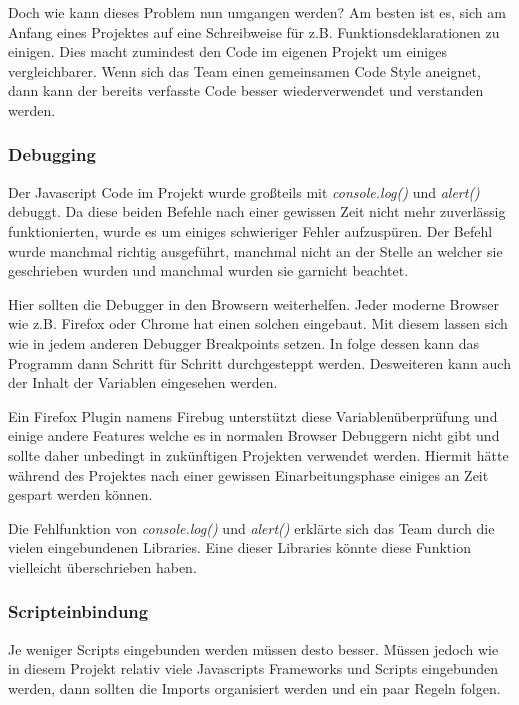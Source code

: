 Doch wie kann dieses Problem nun umgangen werden? Am besten ist es, sich am Anfang eines Projektes auf eine Schreibweise für z.B. Funktionsdeklarationen zu einigen. Dies macht zumindest den Code im eigenen Projekt um einiges vergleichbarer. Wenn sich das Team einen gemeinsamen Code Style aneignet, dann kann der bereits verfasste Code besser wiederverwendet und verstanden werden.

\newpage

\subsubsection{Debugging}
Der Javascript Code im Projekt wurde großteils mit \textit{console.log()} und \textit{alert()} debuggt. Da diese beiden Befehle nach einer gewissen Zeit nicht mehr zuverlässig funktionierten, wurde es um einiges schwieriger Fehler aufzuspüren. Der Befehl wurde manchmal richtig ausgeführt, manchmal nicht an der Stelle an welcher sie geschrieben wurden und manchmal wurden sie garnicht beachtet. 

Hier sollten die Debugger in den Browsern weiterhelfen. Jeder moderne Browser wie z.B. Firefox oder Chrome hat einen solchen eingebaut. Mit diesem lassen sich wie in jedem anderen Debugger Breakpoints setzen. In folge dessen kann das Programm dann Schritt für Schritt durchgesteppt werden. Desweiteren kann auch der Inhalt der Variablen eingesehen werden. 

Ein Firefox Plugin namens Firebug unterstützt diese Variablenüberprüfung und einige andere Features welche es in normalen Browser Debuggern nicht gibt und sollte daher unbedingt in zukünftigen Projekten verwendet werden. Hiermit hätte während des Projektes nach einer gewissen Einarbeitungsphase einiges an Zeit gespart werden können. 


Die Fehlfunktion von \textit{console.log()} und \textit{alert()} erklärte sich das Team durch die vielen eingebundenen Libraries. Eine dieser Libraries könnte diese Funktion vielleicht überschrieben haben.

\newpage

\subsubsection{Scripteinbindung}
Je weniger Scripts eingebunden werden müssen desto besser. Müssen jedoch wie in diesem Projekt relativ viele Javascripts Frameworks und Scripts eingebunden werden, dann sollten die Imports organisiert werden und ein paar Regeln folgen.

